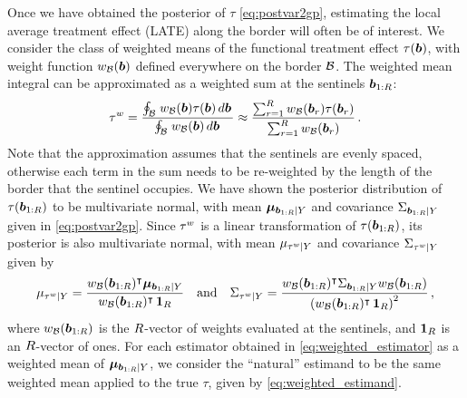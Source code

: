 Once we have obtained the posterior of \(\tau\) \eqref{eq:postvar2gp}, estimating the local average treatment effect (LATE) along the border will often be of interest.
We consider the class of weighted means of the functional treatment effect \(\tau\del{\sentinel}\),
with weight function \(w_{\mathcal{B}}(\bm{b})\) defined everywhere on the border \(\mathcal{B}\).
The weighted mean integral can be approximated as a weighted sum at the sentinels \(\bm{b}_{1:R}\):
\begin{equation}
    \tau^{w} = \frac{\oint_{\mathcal{B}} \left. w_{\mathcal{B}}(\bm{b}) \tau(\bm{b}) \mathop{d \bm{b}} \right.}
    {\oint_{\mathcal{B}} \left. w_{\mathcal{B}}(\bm{b}) \mathop{d \bm{b}} \right.}
    \approx \frac{\sum_{r=1}^R w_{\mathcal{B}}(\bm{b}_r) \tau(\bm{b}_r)}
    {\sum_{r=1}^R w_{\mathcal{B}}(\bm{b}_r) } \,.
\label{eq:weighted_estimand}
\end{equation}
Note that the approximation assumes that the sentinels are evenly spaced, otherwise each term in the sum needs to be re-weighted by the length of the border that the sentinel occupies.
We have shown the posterior distribution of \(\tau(\bm{b}_{1:R})\) to be multivariate normal, with mean \(\bm{\mu}_{\bm{b}_{1:R} \mid Y}\) and covariance \(\Sigma_{\bm{b}_{1:R} \mid Y}\) given in \autoref{eq:postvar2gp}.
Since \(\tau^{w}\) is a linear transformation of \(\tau(\bm{b}_{1:R})\), its posterior is also multivariate normal, with mean \(\mu_{\tau^{w} \mid Y}\) and covariance \(\Sigma_{\tau^{w} \mid Y}\) given by
\begin{equation}
    \mu_{\tau^{w} \mid Y} = \frac{w_{\mathcal{B}}(\bm{b}_{1:R})^{\intercal} \bm{\mu}_{\bm{b}_{1:R} \mid Y}}
    {w_{\mathcal{B}}(\bm{b}_{1:R})^{\intercal}  \operatorname{\mathbf{1}}_R}\quad\text{and}\quad
    \Sigma_{\tau^{w} \mid Y} = \frac{w_{\mathcal{B}}(\bm{b}_{1:R})^{\intercal} \Sigma_{\bm{b}_{1:R} \mid Y} w_{\mathcal{B}}(\bm{b}_{1:R})}
    { \left\lparen w_{\mathcal{B}}(\bm{b}_{1:R})^{\intercal}  \operatorname{\mathbf{1}}_R \right\rparen^2 } \,,
\label{eq:weighted_estimator}
\end{equation}
where \(w_{\mathcal{B}}(\bm{b}_{1:R})\) is the \(R\)-vector of weights evaluated at the sentinels, and \(\operatorname{\mathbf{1}}_R\) is an \(R\)-vector of ones.
For each estimator obtained in \autoref{eq:weighted_estimator} as a weighted mean of \(\bm{\mu}_{\bm{b}_{1:R} \mid Y}\), we consider the ``natural'' estimand to be the same weighted mean applied to the true \(\tau\), given by \autoref{eq:weighted_estimand}.

